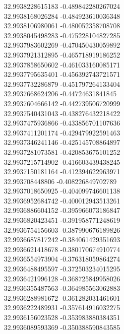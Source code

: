 {32.9938228615183	-0.489842280267024\\
32.9938168026284	-0.484923610036348\\
32.9938106980061	-0.480052358708708\\
32.9938045498283	-0.475228104827285\\
32.9937983602269	-0.470450430059892\\
32.9937921312895	-0.465718919186252\\
32.9937858650602	-0.461033160085171\\
32.9937795635401	-0.456392743721571\\
32.9937732286879	-0.451797264133404\\
32.9937668624206	-0.44724631841845\\
32.9937604666142	-0.442739506720999\\
32.9937540431043	-0.438276432218422\\
32.9937475936866	-0.433856701107636\\
32.9937411201174	-0.429479922591463\\
32.9937346241146	-0.425145708864897\\
32.9937281073581	-0.420853675101252\\
32.9937215714902	-0.416603439438245\\
32.9937150181164	-0.412394622963971\\
32.993708448806	-0.408226849702789\\
32.9937018650925	-0.404099746601138\\
32.9936952684742	-0.400012943513261\\
32.9936886604152	-0.395966073186847\\
32.9936820423451	-0.391958771248619\\
32.9936754156603	-0.387990676189826\\
32.9936687817242	-0.384061429351693\\
32.9936621418678	-0.380170674910774\\
32.9936554973904	-0.376318059864274\\
32.9936488495597	-0.372503234015295\\
32.9936421996128	-0.368725849958026\\
32.9936355487563	-0.364985563062883\\
32.9936288981672	-0.361282031461601\\
32.9936222489931	-0.357614916032275\\
32.9936156023528	-0.353983880384351\\
32.9936089593369	-0.350388590843585\\
}
